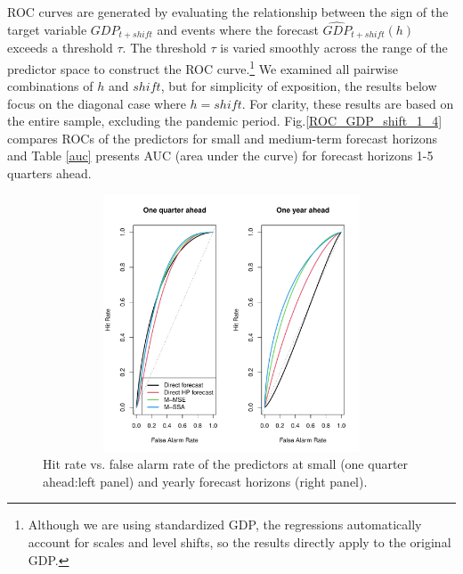 \documentclass[11pt,a4paper]{article}
\begin{document}
ROC curves are generated by evaluating the relationship between the sign of the target variable $GDP_{t+shift}$  and events where the forecast $\hat{GDP}_{t+shift}(h)$ exceeds a threshold $\tau$. The threshold $\tau$ is varied smoothly across the range of the predictor space to construct the ROC curve.\footnote{Although we are using standardized GDP, the regressions automatically account for scales and level shifts, so the results directly apply to the original GDP.} We examined all pairwise combinations of $h$ and $shift$, but for simplicity of exposition, the results below focus on the diagonal case where $h=shift$. 
For clarity, these results are based on the entire sample, excluding the pandemic period. Fig.\eqref{ROC_GDP_shift_1_4} compares ROCs of the predictors for small and medium-term forecast horizons and Table \eqref{auc} presents AUC (area under the curve) for forecast horizons 1-5 quarters ahead.
\begin{figure}[h]\begin{center}\includegraphics[height=3in, width=5in]{./Figures/ROC_GDP_shift_1_4.pdf}\caption{Hit rate vs. false alarm rate of the predictors at small (one quarter ahead:left panel) and yearly forecast horizons (right panel).\label{ROC_GDP_shift_1_4}}\end{center}\end{figure}
\end{document}
